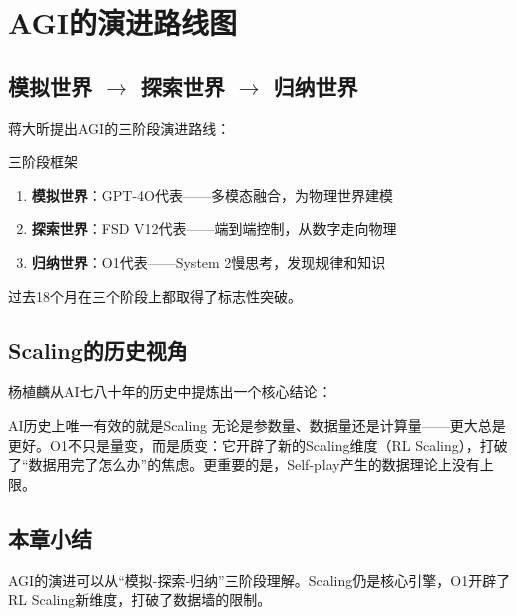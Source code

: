 \section{AGI的演进路线图}

\subsection{模拟世界 $\rightarrow$ 探索世界 $\rightarrow$ 归纳世界}

蒋大昕提出AGI的三阶段演进路线：

\begin{knowledgebox}{三阶段框架}
\begin{enumerate}
\item \textbf{模拟世界}：GPT-4O代表——多模态融合，为物理世界建模
\item \textbf{探索世界}：FSD V12代表——端到端控制，从数字走向物理
\item \textbf{归纳世界}：O1代表——System 2慢思考，发现规律和知识
\end{enumerate}
过去18个月在三个阶段上都取得了标志性突破。
\end{knowledgebox}

\subsection{Scaling的历史视角}

杨植麟从AI七八十年的历史中提炼出一个核心结论：

\begin{importantbox}{AI历史上唯一有效的就是Scaling}
无论是参数量、数据量还是计算量——更大总是更好。O1不只是量变，而是质变：它开辟了新的Scaling维度（RL Scaling），打破了``数据用完了怎么办''的焦虑。更重要的是，Self-play产生的数据理论上没有上限。
\end{importantbox}

\subsection{本章小结}

AGI的演进可以从``模拟-探索-归纳''三阶段理解。Scaling仍是核心引擎，O1开辟了RL Scaling新维度，打破了数据墙的限制。


